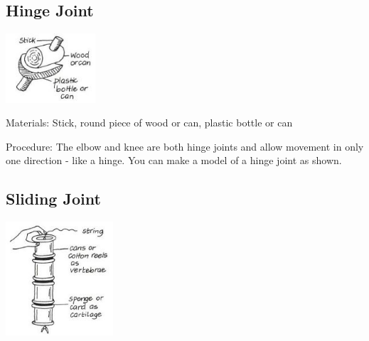 \begin{multicols}{2}
\subsection{Hinge Joint}

\begin{center}
\includegraphics[width=0.25\textwidth]{./img/vso/hinge-joint.jpg}
\end{center}

\begin{description*}
\item[Materials:]{Stick, round piece of wood or can, plastic bottle or can}
\item[Procedure:]{The elbow and knee are both
hinge joints and allow movement
in only one direction - like a
hinge. You can make a model of a
hinge joint as shown.}
\end{description*}

\subsection{Sliding Joint}

\begin{center}
\includegraphics[width=0.3\textwidth]{./img/vso/sliding-joint.jpg}
\end{center}


\end{multicols}
